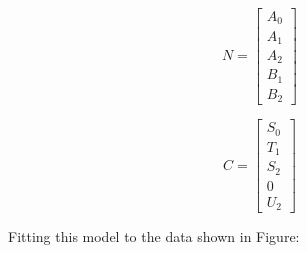 \begin{multicols}{2}
\begin{equation}
\label{equ:rlc_N}
N = 
\begin{bmatrix}
A_0 \\
A_1 \\
A_2 \\
B_1 \\
B_2
\end{bmatrix}
\end{equation}

\begin{equation}
\label{equ:rlc_C}
C = 
\begin{bmatrix}
S_0 \\
T_1 \\
S_2 \\
0   \\
U_2
\end{bmatrix}
\end{equation}
\end{multicols}

Fitting this model to the data shown in Figure:

